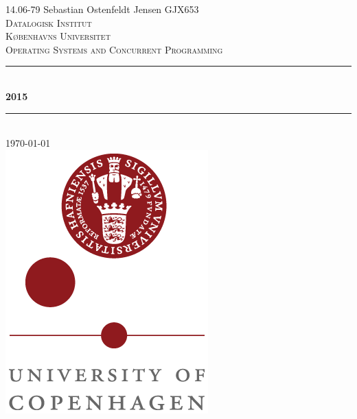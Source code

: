 \documentclass[a4paper,12pt,danish]{report}
\begin{document}
\begin{titlepage}

\newcommand{\HRule}{\rule{\linewidth}{0.4mm}}
\center
\small{14.06-79 Sebastian Ostenfeldt Jensen \textsc{GJX653}
} \\[2cm]

\textsc{\LARGE Datalogisk Institut}\\[0.5cm]
\textsc{\large Københavns Universitet}\\[1.5cm]
\textsc{\large Operating Systems and Concurrent Programming}\\
\HRule \\[0.7cm]
{\huge \bfseries 2015}\\[0.4cm]
\HRule \\[1.5cm]
\textsc{\Large \textsc{\today}}\\[0.5cm]

\includegraphics[scale=0.5]{ku_logo.png}\\[1cm]

\end{titlepage}
\tableofcontents
\newpage
\renewcommand{\thesection}{\arabic{section}}
\renewcommand{\thempfootnote}{\arabic{mpfootnote}}
\renewcommand\thesubsection{}
\newcommand{\minus}[1]{{#1}^{-}}
\end{document}
